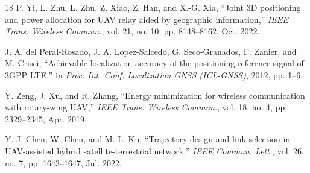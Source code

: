 \documentclass[10pt,journal,letterpaper]{IEEEtran}
\begin{document}
\begin{thebibliography}{18}
P. Yi, L. Zhu, L. Zhu, Z. Xiao, Z. Han, and X.-G. Xia, ``Joint 3D positioning and power allocation for UAV relay aided by geographic information,'' \emph{IEEE Trans. Wireless Commun.}, vol. 21, no. 10, pp. 8148--8162, Oct. 2022.

J. A. del Peral-Rosado, J. A. Lopez-Salcedo, G. Seco-Granados, F. Zanier, and M. Crisci, ``Achievable localization accuracy of the positioning reference signal of 3GPP LTE,'' in \emph{Proc. Int. Conf. Localization GNSS (ICL-GNSS)}, 2012, pp. 1--6.

Y. Zeng, J. Xu, and R. Zhang, ``Energy minimization for wireless communication with rotary-wing UAV,'' \emph{IEEE Trans. Wireless Commun.}, vol. 18, no. 4, pp. 2329--2345, Apr. 2019.

Y.-J. Chen, W. Chen, and M.-L. Ku, ``Trajectory design and link selection in UAV-assisted hybrid satellite-terrestrial network,'' \emph{IEEE Commun. Lett.}, vol. 26, no. 7, pp. 1643--1647, Jul. 2022.

\end{thebibliography}
\end{document}

